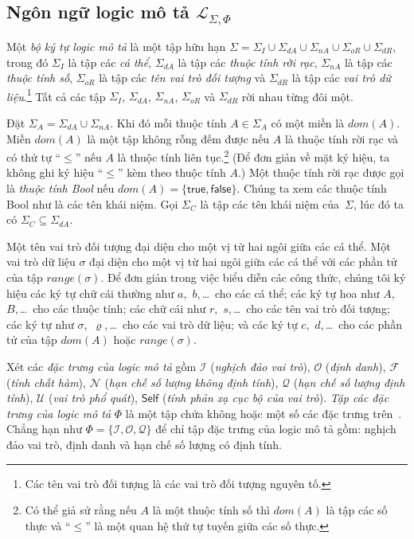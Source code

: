 \documentclass[12pt,a4paper,twoside]{report}
\newcommand{\mL}		{\mathcal{L}}
\newcommand{\mI}		{\mathcal{I}}
\newcommand{\mO}		{\mathcal{O}}
\newcommand{\mN}		{\mathcal{N}}
\newcommand{\mQ}		{\mathcal{Q}}
\newcommand{\mF}		{\mathcal{F}}
\newcommand{\mU}		{\mathcal{U}}
\newcommand{\SigmaI}	{\Sigma_I}
\newcommand{\SigmaA}	{\Sigma_A}
\newcommand{\SigmaC}	{\Sigma_C}
\newcommand{\SigmaDA}	{\Sigma_{dA}}
\newcommand{\SigmaNA}	{\Sigma_{nA}}
\newcommand{\SigmaOR}	{\Sigma_{oR}}
\newcommand{\SigmaDR}	{\Sigma_{dR}}
\newcommand{\True}		{\mathsf{true}}
\newcommand{\False}		{\mathsf{false}}
\newcommand{\Self}		{\mathsf{Self}}
\newcommand{\mLSP}		{\mL_{\Sigma,\Phi}}
\newcommand{\Dom}		{\mathit{dom}}
\newcommand{\Range}		{\mathit{range}}
\theoremstyle{definition}
\begin{document}
\subsection{Ngôn ngữ logic mô tả $\mLSP$}

Một {\em bộ ký tự logic mô tả} là một tập hữu hạn $\Sigma = \SigmaI \cup \SigmaDA \cup \SigmaNA \cup \SigmaOR \cup \SigmaDR$, trong đó $\SigmaI$ là tập các {\em cá thể}, $\SigmaDA$ là tập các {\em thuộc tính rời rạc}, $\SigmaNA$ là tập các {\em thuộc tính số}, $\SigmaOR$ là tập các {\em tên vai trò đối tượng} và $\SigmaDR$ là tập các {\em vai trò dữ liệu}.\footnote{Các tên vai trò đối tượng là các vai trò đối tượng nguyên tố.} Tất cả các tập $\SigmaI$, $\SigmaDA$, $\SigmaNA$, $\SigmaOR$ và $\SigmaDR$ rời nhau từng đôi một.

Đặt $\SigmaA = \SigmaDA \cup \SigmaNA$. Khi đó mỗi thuộc tính $A \in \SigmaA$ có một miền là $\Dom(A)$. Miền $\Dom(A)$ là một tập không rỗng đếm được nếu $A$ là thuộc tính rời rạc và có thứ tự ``$\leq$'' nếu $A$ là thuộc tính liên tục.\footnote{Có thể giả sử rằng nếu $A$ là một thuộc tính số thì $\Dom(A)$ là tập các số thực và ``$\leq$'' là một quan hệ thứ tự tuyến giữa các số thực.} (Để đơn giản về mặt ký hiệu, ta không ghi ký hiệu ``$\leq$'' kèm theo thuộc tính $A$.) 
%
Một thuộc tính rời rạc được gọi là {\em thuộc tính Bool} nếu $\Dom(A) = \{\True,\False\}$. Chúng ta xem các thuộc tính Bool như là các tên khái niệm. Gọi $\SigmaC$ là tập các tên khái niệm của~$\Sigma$, lúc đó ta có $\SigmaC \subseteq \SigmaDA$.

Một tên vai trò đối tượng đại diện cho một vị từ hai ngôi giữa các cá thể. Một vai trò dữ liệu $\sigma$ đại diện cho một vị từ hai ngôi giữa các cá thể với các phần tử của tập $\Range(\sigma)$.
%
Để đơn giản trong việc biểu diễn các công thức, chúng tôi ký hiệu các ký tự chữ cái thường như $a$,~$b$,\,\ldots\ cho các cá thể; các ký tự hoa như $A$,~$B$,\,\ldots\ cho các thuộc tính; các chữ cái như $r$,~$s$,\,\ldots\ cho các tên vai trò đối tượng; các ký tự như $\sigma$,~$\varrho$,\,\ldots\ cho các vai trò dữ liệu; và các ký tự $c$,~$d$,\,\ldots\ cho các phần tử của tập $\Dom(A)$ hoặc $\Range(\sigma)$.

Xét các {\em đặc trưng của logic mô tả} gồm $\mI$ ({\em nghịch đảo vai trò}), $\mO$ ({\em định danh}), $\mF$ ({\em tính chất hàm}), $\mN$ ({\em hạn chế số lượng không định tính}), $\mQ$ ({\em hạn chế số lượng định tính}), $\mU$ ({\em vai trò phổ quát}), $\Self$ ({\em tính phản xạ cục bộ của vai trò}). {\em Tập các đặc trưng của logic mô tả} $\Phi$ là một tập chứa không hoặc một số các đặc trưng trên~\cite{Divroodi2011B,Nguyen2013,Tran2012,Tran2013}. Chẳng hạn như $\Phi = \{\mI, \mO, \mQ\}$ để chỉ tập đặc trưng của logic mô tả gồm: nghịch đảo vai trò, định danh và hạn chế số lượng có định tính.
\end{document}
